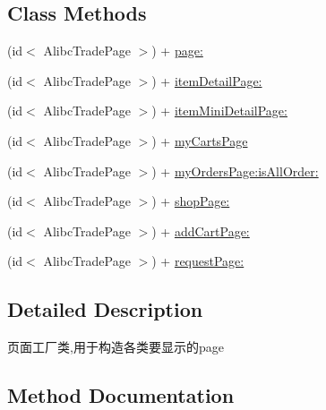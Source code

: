 \subsection*{Class Methods}
\begin{DoxyCompactItemize}
\item 
(id$<$ Alibc\+Trade\+Page $>$) + \mbox{\hyperlink{interface_alibc_trade_page_factory_a066f98de1eb14f7c767fd3a3d32ed8ac}{page\+:}}
\item 
(id$<$ Alibc\+Trade\+Page $>$) + \mbox{\hyperlink{interface_alibc_trade_page_factory_a0e8052358a1f6579f60a4fe60bd00508}{item\+Detail\+Page\+:}}
\item 
(id$<$ Alibc\+Trade\+Page $>$) + \mbox{\hyperlink{interface_alibc_trade_page_factory_a371f2a1d4e51fefcc05c11b2133a825c}{item\+Mini\+Detail\+Page\+:}}
\item 
(id$<$ Alibc\+Trade\+Page $>$) + \mbox{\hyperlink{interface_alibc_trade_page_factory_a05916ca9c20018ab175e806daa6b8927}{my\+Carts\+Page}}
\item 
(id$<$ Alibc\+Trade\+Page $>$) + \mbox{\hyperlink{interface_alibc_trade_page_factory_a77f3b85bc47e39b82b5c20459c0d4492}{my\+Orders\+Page\+:is\+All\+Order\+:}}
\item 
(id$<$ Alibc\+Trade\+Page $>$) + \mbox{\hyperlink{interface_alibc_trade_page_factory_a9cf90afb144f2ce51f7ed2dca4166897}{shop\+Page\+:}}
\item 
(id$<$ Alibc\+Trade\+Page $>$) + \mbox{\hyperlink{interface_alibc_trade_page_factory_a3c4e1490da49217dae8067c2641dc052}{add\+Cart\+Page\+:}}
\item 
(id$<$ Alibc\+Trade\+Page $>$) + \mbox{\hyperlink{interface_alibc_trade_page_factory_a75b1d5426dc6e4eb9a6d2560312fe773}{request\+Page\+:}}
\end{DoxyCompactItemize}


\subsection{Detailed Description}
页面工厂类,用于构造各类要显示的page 

\subsection{Method Documentation}
\mbox{\label{interface_alibc_trade_page_factory_a3c4e1490da49217dae8067c2641dc052}} 
